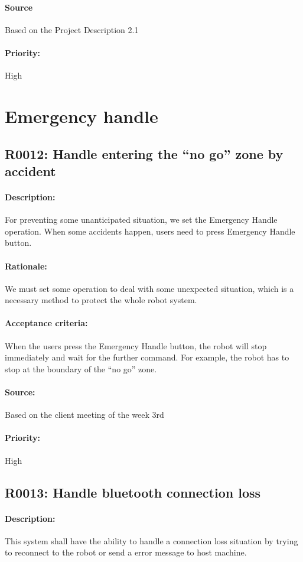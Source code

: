 \documentclass[11pt, a4paper]{report}
\begin{document}
\paragraph{Source}
Based on the Project Description 2.1
\paragraph{Priority:}
High


\section{Emergency handle}
\subsection{R0012: Handle entering the “no go” zone by accident}
\paragraph{Description:}
For preventing some unanticipated situation, we set the Emergency Handle operation. When some accidents happen, users need to press Emergency Handle button.
\paragraph{Rationale:}
We must set some operation to deal with some unexpected situation, which is a necessary method to protect the whole robot system. 
\paragraph{Acceptance criteria:}
When the users press the Emergency Handle button, the robot will stop immediately and wait for the further command. For example, the robot has to stop at the boundary of the “no go” zone. 
\paragraph{Source:}
Based on the client meeting of the week 3rd
\paragraph{Priority:}
High  


\subsection{R0013: Handle bluetooth connection loss}
\paragraph{Description:}
This system shall have the ability to handle a connection loss situation by trying to reconnect to the robot or send a error message to host machine. 
\end{document}
